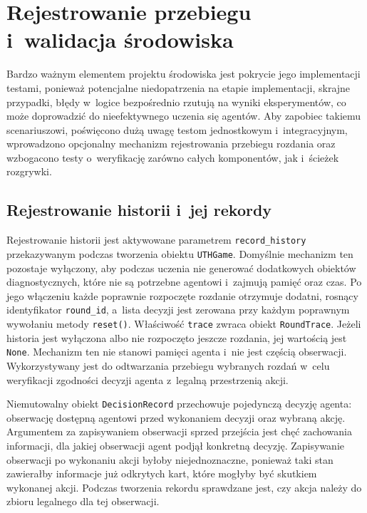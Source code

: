 \section{Rejestrowanie przebiegu i~walidacja środowiska}
\label{sec:rejestrowanie-i-walidacja}

Bardzo ważnym elementem projektu środowiska jest pokrycie jego implementacji testami,
ponieważ potencjalne niedopatrzenia na etapie implementacji, skrajne przypadki, błędy w~logice
bezpośrednio rzutują na wyniki eksperymentów, co może doprowadzić do nieefektywnego uczenia się agentów.
Aby zapobiec takiemu scenariuszowi, poświęcono dużą uwagę testom jednostkowym i~integracyjnym,
wprowadzono opcjonalny mechanizm rejestrowania przebiegu rozdania oraz wzbogacono testy o~weryfikację zarówno całych komponentów, jak i~ścieżek rozgrywki.

\subsection{Rejestrowanie historii i~jej rekordy}
\label{subsec:rekordy-historii}

Rejestrowanie historii jest aktywowane parametrem
\texttt{record\_history} przekazywanym podczas tworzenia obiektu
\texttt{UTHGame}. Domyślnie mechanizm ten pozostaje wyłączony, aby podczas uczenia
nie generować dodatkowych obiektów diagnostycznych, które nie są potrzebne agentowi i~zajmują pamięć oraz czas.
Po jego włączeniu każde poprawnie rozpoczęte rozdanie otrzymuje dodatni, rosnący
identyfikator \texttt{round\_id}, a~lista decyzji jest zerowana przy każdym poprawnym
wywołaniu metody \texttt{reset()}. Właściwość \texttt{trace} zwraca obiekt
\texttt{RoundTrace}. Jeżeli historia jest wyłączona albo nie rozpoczęto jeszcze
rozdania, jej wartością jest \texttt{None}. Mechanizm ten nie stanowi pamięci agenta
i~nie jest częścią obserwacji. Wykorzystywany jest do odtwarzania przebiegu wybranych
rozdań w~celu weryfikacji zgodności decyzji agenta z~legalną przestrzenią akcji.

Niemutowalny obiekt \texttt{DecisionRecord} przechowuje pojedynczą decyzję agenta:
obserwację dostępną agentowi przed
wykonaniem decyzji oraz wybraną akcję. Argumentem za zapisywaniem obserwacji sprzed przejścia
jest chęć zachowania informacji, dla jakiej obserwacji agent podjął konkretną decyzję.
Zapisywanie obserwacji po wykonaniu akcji byłoby niejednoznaczne,
ponieważ taki stan zawierałby informacje już odkrytych kart, które mogłyby być skutkiem wykonanej akcji.
Podczas tworzenia rekordu
sprawdzane jest, czy akcja należy do zbioru
legalnego dla tej obserwacji.

